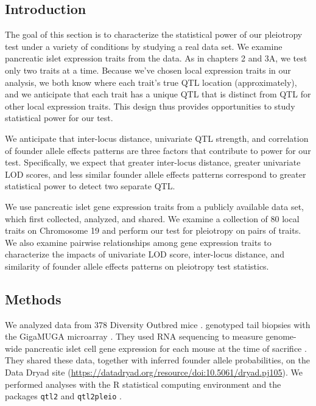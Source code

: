 \documentclass{book}
\begin{document}
\subsection{Introduction}

The goal of this section is to characterize the statistical power of our pleiotropy test under a variety of conditions by studying a real data set. We examine pancreatic islet expression traits from the \citet{keller2018genetic} data. As in chapters 2 and 3A, we test only two traits at a time. Because we’ve chosen local expression traits in our analysis, we both know where each trait’s true QTL location (approximately), and we anticipate that each trait has a unique QTL that is distinct from QTL for other local expression traits. This design thus provides opportunities to study statistical power for our test.

We anticipate that inter-locus distance, univariate QTL strength, and correlation of founder allele effects patterns are three factors that contribute to power for our test. Specifically, we expect that greater inter-locus distance, greater univariate LOD scores, and less similar founder allele effects patterns correspond to greater statistical power to detect two separate QTL.

We use pancreatic islet gene expression traits from a publicly available data set, which \citet{keller2018genetic} first collected, analyzed, and shared. We examine a collection of 80 local traits on Chromosome 19 and perform our test for pleiotropy on pairs of traits. We also examine pairwise relationships among gene expression traits to characterize the impacts of univariate LOD score, inter-locus distance, and similarity of founder allele effects patterns on pleiotropy test statistics.



\subsection{Methods}


We analyzed data from 378 Diversity Outbred mice \citep{keller2018genetic}. \citet{keller2018genetic} genotyped tail biopsies with the GigaMUGA microarray \citep{morgan2016mouse}. They used RNA sequencing to measure genome-wide pancreatic islet cell gene expression for each mouse at the time of sacrifice \citep{keller2018genetic}. They shared these data, together with inferred founder allele probabilities, on the Data Dryad site (\url{https://datadryad.org/resource/doi:10.5061/dryad.pj105}). We performed analyses with the R statistical computing environment \citep{r} and the packages \texttt{qtl2} \citep{qtl2} and \texttt{qtl2pleio} \citep{qtl2pleio}.
\end{document}
